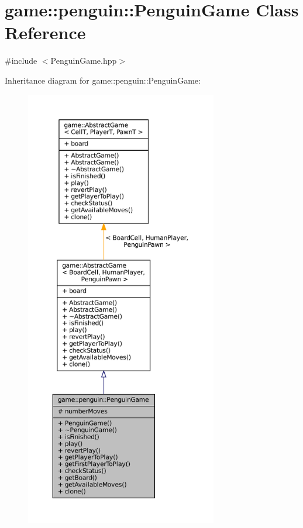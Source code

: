\hypertarget{classgame_1_1penguin_1_1_penguin_game}{}\section{game\+:\+:penguin\+:\+:Penguin\+Game Class Reference}
\label{classgame_1_1penguin_1_1_penguin_game}


{\ttfamily \#include $<$Penguin\+Game.\+hpp$>$}



Inheritance diagram for game\+:\+:penguin\+:\+:Penguin\+Game\+:
\nopagebreak
\begin{figure}[H]
\begin{center}
\leavevmode
\includegraphics[height=550pt]{classgame_1_1penguin_1_1_penguin_game__inherit__graph}
\end{center}
\end{figure}


